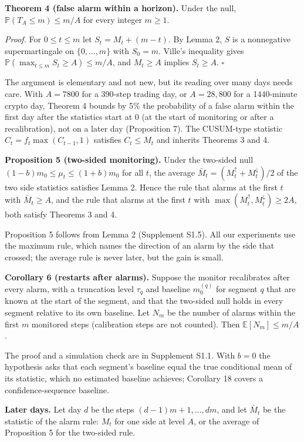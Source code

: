 \documentclass[
]{article}
\begin{document}
\textbf{Theorem 4 (false alarm within a horizon).} Under the null,
\(\mathbb{P}(T_A \le m) \le m/A\) for every integer \(m \ge 1\).

\emph{Proof.} For \(0 \le t \le m\) let \(S_t = M_t + (m - t)\). By
Lemma 2, \(S\) is a nonnegative supermartingale on
\(\lbrace 0, \dots, m \rbrace\) with \(S_0 = m\). Ville's inequality
gives \(\mathbb{P}(\max_{t \le m} S_t \ge A) \le m/A\), and
\(M_t \ge A\) implies \(S_t \ge A\). \(\square\)

The argument is elementary and not new, but its reading over many days
needs care. With \(A = 7800\) for a 390-step trading day, or
\(A = 28{,}800\) for a 1440-minute crypto day, Theorem 4 bounds by 5\%
the probability of a false alarm within the first day after the
statistics start at 0 (at the start of monitoring or after a
recalibration), not on a later day (Proposition 7). The CUSUM-type
statistic \(C_t = f_t \max(C_{t-1}, 1)\) satisfies \(C_t \le M_t\) and
inherits Theorems 3 and 4.

\textbf{Proposition 5 (two-sided monitoring).} Under the two-sided null
\((1-b)m_0 \le \mu_t \le (1+b)m_0\) for all \(t\), the average
\(\bar M_t = (M_t^{\uparrow} + M_t^{\downarrow})/2\) of the two side
statistics satisfies Lemma 2. Hence the rule that alarms at the first
\(t\) with \(\bar M_t \ge A\), and the rule that alarms at the first
\(t\) with \(\max(M_t^{\uparrow}, M_t^{\downarrow}) \ge 2A\), both
satisfy Theorems 3 and 4.

Proposition 5 follows from Lemma 2 (Supplement S1.5). All our
experiments use the maximum rule, which names the direction of an alarm
by the side that crossed; the average rule is never later, but the gain
is small.

\textbf{Corollary 6 (restarts after alarms).} Suppose the monitor
recalibrates after every alarm, with a truncation level \(\tau_q\) and
baseline \(m_0^{(q)}\) for segment \(q\) that are known at the start of
the segment, and that the two-sided null holds in every segment relative
to its own baseline. Let \(N_m\) be the number of alarms within the
first \(m\) monitored steps (calibration steps are not counted). Then
\(\mathbb{E}[N_m] \le m/A\).

The proof and a simulation check are in Supplement S1.1. With \(b = 0\)
the hypothesis asks that each segment's baseline equal the true
conditional mean of its statistic, which no estimated baseline achieves;
Corollary 18 covers a confidence-sequence baseline.

\textbf{Later days.} Let day \(d\) be the steps
\((d-1)m + 1, \dots, dm\), and let \(\bar M_t\) be the statistic of the
alarm rule: \(M_t\) for one side at level \(A\), or the average of
Proposition 5 for the two-sided rule.
\end{document}
